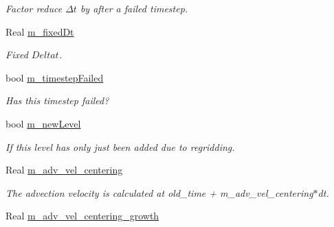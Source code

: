 \begin{DoxyCompactItemize}
\begin{DoxyCompactList}\small\item\em Factor reduce $ \Delta t $ by after a failed timestep. \end{DoxyCompactList}\item 
Real \hyperlink{class_a_m_r_level_mushy_layer_a3111453ab5dbcb11dbf0a3e22c5ef715}{m\-\_\-fixed\-Dt}
\begin{DoxyCompactList}\small\item\em Fixed $ Delta t $. \end{DoxyCompactList}\item 
\hypertarget{class_a_m_r_level_mushy_layer_abf254beee2f05065819e03b76e824d04}{bool \hyperlink{class_a_m_r_level_mushy_layer_abf254beee2f05065819e03b76e824d04}{m\-\_\-timestep\-Failed}}\label{class_a_m_r_level_mushy_layer_abf254beee2f05065819e03b76e824d04}

\begin{DoxyCompactList}\small\item\em Has this timestep failed? \end{DoxyCompactList}\item 
\hypertarget{class_a_m_r_level_mushy_layer_a9f70722407eeabafaddd7b045066c6dd}{bool \hyperlink{class_a_m_r_level_mushy_layer_a9f70722407eeabafaddd7b045066c6dd}{m\-\_\-new\-Level}}\label{class_a_m_r_level_mushy_layer_a9f70722407eeabafaddd7b045066c6dd}

\begin{DoxyCompactList}\small\item\em If this level has only just been added due to regridding. \end{DoxyCompactList}\item 
Real \hyperlink{class_a_m_r_level_mushy_layer_af41eb6058681e1345ce40633dd9fde1f}{m\-\_\-adv\-\_\-vel\-\_\-centering}
\begin{DoxyCompactList}\small\item\em The advection velocity is calculated at old\-\_\-time + m\-\_\-adv\-\_\-vel\-\_\-centering$\ast$dt. \end{DoxyCompactList}\item 
\hypertarget{class_a_m_r_level_mushy_layer_a532678009eb6a62cb967f6578c88fef6}{Real \hyperlink{class_a_m_r_level_mushy_layer_a532678009eb6a62cb967f6578c88fef6}{m\-\_\-adv\-\_\-vel\-\_\-centering\-\_\-growth}}\label{class_a_m_r_level_mushy_layer_a532678009eb6a62cb967f6578c88fef6}


\end{DoxyCompactItemize}
